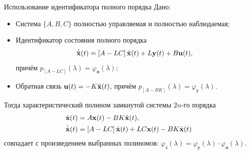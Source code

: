 \documentclass[notheorems,aspectratio=169]{beamer}
\theoremstyle{definition}
\begin{document}
\begin{frame}{Использование идентификатора полного порядка}
  Дано:
  \begin{itemize}
  \item Система $\{A, B, C\}$ полностью управляемая и полностью наблюдаемая;
  \item Идентификатор состояния полного порядка
    \begin{equation*}
      \dot{\hat{\vb{x}}}(t) = \left[A - LC\right] \hat{\vb{x}}(t) + L \vb{y}(t) + B \vb{u}(t),
    \end{equation*}
    причём $p_{\left[A - LC\right]}(\lambda) = \varphi_{\text{и}}(\lambda)$;
  \item Обратная связь $\vb{u}(t) = -K\hat{\vb{x}}(t)$,
    причём $p_{\left[A - BK\right]}(\lambda) = \varphi_{\text{у}}(\lambda)$.
  \end{itemize}
  
  Тогда характеристический полином замкнутой системы $2n$-го порядка
  \begin{equation*}
    \begin{aligned}
      \dot{\vb{x}}(t) &= A \vb{x}(t) - BK \hat{\vb{x}}(t), \\
      \dot{\hat{\vb{x}}}(t) &= \left[A - LC\right] \hat{\vb{x}}(t)
      + LC \vb{x}(t) - BK \hat{\vb{x}}(t)
    \end{aligned}
  \end{equation*}
  совпадает с произведением выбранных полиномов: $\varphi_{\text{з}}(\lambda) = \varphi_{\text{у}}(\lambda) \cdot \varphi_{\text{и}}(\lambda)$.
\end{frame}
\end{document}
